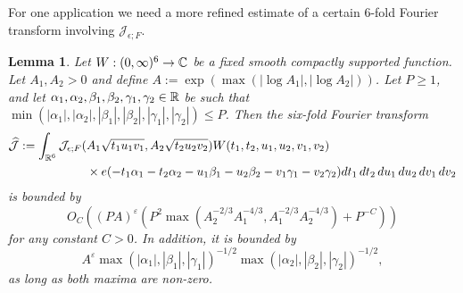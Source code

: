 \documentclass[11pt]{amsart}
\theoremstyle{plain}
\newtheorem{lemma}{Lemma}
\numberwithin{equation}{section}
\theoremstyle{definition}
\renewcommand{\geq}{\geqslant}
\renewcommand{\leq}{\leqslant}
\begin{document}
 
 For one application we need a more refined estimate of a certain $6$-fold Fourier transform involving $\mathcal{J}_{\epsilon;F}$. 
 
 \begin{lemma}\label{stat2}  Let $W : (0, \infty)^6 \rightarrow\Bbb{C}$ be a fixed smooth compactly supported function. Let $A_1, A_2 > 0$ and define $A := \exp(\max (|\log A_1|, |\log A_2|))$. Let $P \geq 1$, and let $\alpha_1, \alpha_2, \beta_1, \beta_2, \gamma_1, \gamma_2 \in \Bbb{R}$ be   such that $\min(|\alpha_1|, |\alpha_2|, |\beta_1|, |\beta_2|, |\gamma_1|, |\gamma_2| ) \leq P$.   Then the six-fold Fourier transform
\begin{displaymath}
\begin{split}
\widehat{\mathcal{J}} :=   \int_{\Bbb{R}^6} \mathcal{J}_{\epsilon; F}(&A_1 \sqrt{t_1u_1v_1}, A_2\sqrt{t_2u_2v_2}) W(t_1, t_2, u_1, u_2, v_1, v_2)\\
 &\times e(-t_1\alpha_1 - t_2\alpha_2 - u_1\beta_1-u_2\beta_2 - v_1\gamma_1-v_2\gamma_2) dt_1\, dt_2\, du_1\, du_2\, dv_1\, dv_2
 \end{split}
 \end{displaymath}
is bounded by 
\begin{equation}\label{new1}
O_C\left((PA)^{\varepsilon}( P^2 \max\left(A_2^{-2/3} A_1^{-4/3}, A_1^{-2/3} A_2^{-4/3}\right)+ P^{-C})\right)
\end{equation}
for any constant $C > 0$. In addition, it is bounded by
\begin{equation}\label{new2}
A^{\varepsilon}\max(|\alpha_1|,   |\beta_1|,   |\gamma_1|  )^{-1/2} \max(|\alpha_2|,   |\beta_2|,   |\gamma_2|  )^{-1/2},
\end{equation}
as long as both maxima are non-zero.
\end{lemma}
\end{document}
